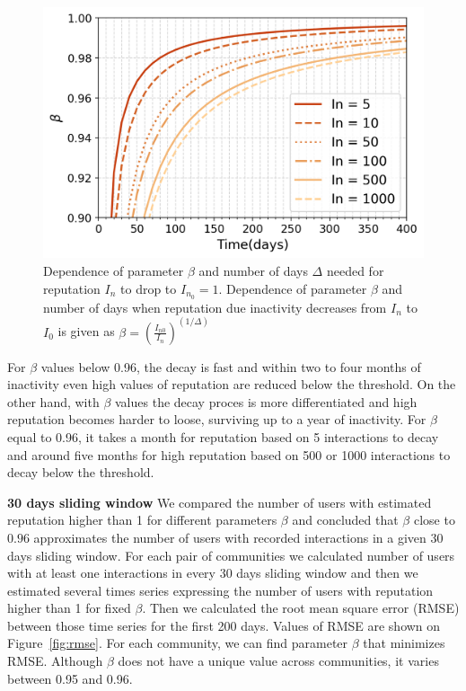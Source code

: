 \begin{figure}[h!]
	\centering
	\includegraphics[width=0.5\linewidth]{Figures/FigA1.png}
	\caption{Dependence of parameter $\beta$ and number of days $\Delta$ needed for reputation $I_n$ to drop to $I_{n_0} = 1$. Dependence of parameter $\beta$ and number of days when reputation due inactivity decreases from $I_n$ to $I_0$ is given as  $\beta = (\frac{I_{n0}}{I_{n}})^{(1/\Delta)}$ }
	\label{fig:betadelta}
\end{figure}

For $\beta$ values below 0.96, the decay is fast and within two to four months of inactivity even high values of reputation are reduced below the threshold. On the other hand, with $\beta$ values the decay proces is more differentiated and high reputation becomes harder to loose, surviving up to a year of inactivity. For $\beta$ equal to 0.96, it takes a month for reputation based on 5 interactions to decay and around five months for high reputation based on 500 or 1000 interactions to decay below the threshold.

\textbf{30 days sliding window} We compared the number of users with estimated reputation higher than 1 for different parameters $\beta$ and concluded that $\beta$ close to $0.96$ approximates the number of users with recorded interactions in a given 30 days sliding window. For each pair of communities we calculated number of users with at least one interactions in every 30 days sliding window and then we estimated several times series expressing the number of users with reputation higher than 1 for fixed $\beta$. Then we calculated the root mean square error (RMSE) between those time series for the first 200 days. Values of RMSE are shown on Figure~\ref{fig:rmse}. For each community, we can find parameter $\beta$ that minimizes RMSE. Although $\beta$ does not have a unique value across communities, it varies between 0.95 and 0.96. 


